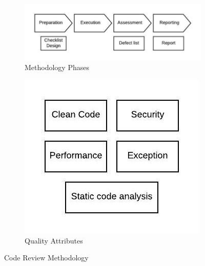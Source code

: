 \documentclass[15pt]{article}
\begin{document}
\begin{CJK*}{UTF8}{gbsn}
{\begin{figure}[ht]
\centering
	\begin{subfigure}{0.49\linewidth}\centering
    \includegraphics[scale = 0.7]{flow.jpeg}
    \caption{Methodology Phases}\label{fig:figA}
    \end{subfigure}
	\begin{subfigure}{0.49\linewidth}\centering
    	\includegraphics[scale = 0.7]{quality.jpeg}
        \caption{Quality Attributes}\label{fig:figB}
  		\end{subfigure}
\caption{Code Review Methodology} \label{fig:twofigs}
\end{figure}

}
\end{CJK*}
\end{document}
